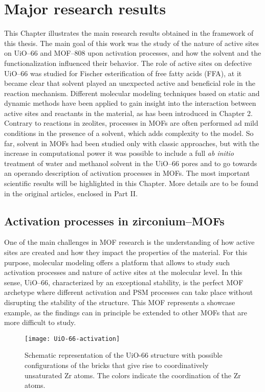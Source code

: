 \graphicspath{{figures/chapter3/}}
\renewcommand\evenpagerightmark{{\scshape\small Major research results}}
\renewcommand\oddpageleftmark{{\scshape\small Chapter 3}}

\hyphenation{}
\chapter[Major research results]%
{Major research results}
\label{ch3}
This Chapter illustrates the main research results obtained in the framework of this thesis. The main goal of this work was the study of the nature of active sites on UiO--66 and MOF--808 upon activation processes, and how the solvent and the functionalization influenced their behavior. The role of active sites on defective UiO--66 was studied for Fischer esterification of free fatty acids (FFA), at it became clear that solvent played an unexpected active and beneficial role in the reaction mechanism. Different molecular modeling techniques based on static and dynamic methods have been applied to gain insight into the interaction between active sites and reactants in the material, as has been introduced in Chapter 2. Contrary to reactions in zeolites, processes in MOFs are often performed ad mild conditions in the presence of a solvent, which adds complexity to the model. So far, solvent in MOFs had been studied only with classic approaches, but with the increase in computational power it was possible to include a full \textit{ab initio} treatment of water and methanol solvent in the UiO--66 pores and to go towards an operando description of activation processes in MOFs. The most important scientific results will be highlighted in this Chapter. More details are to be found in the original articles, enclosed in Part II.

\section{Activation processes in zirconium--MOFs}
One of the main challenges in MOF research is the understanding of how active sites are created and how they impact the properties of the material. For this purpose, molecular modeling offers a platform that allows to study such activation processes and nature of active sites at the molecular level. In this sense, UiO--66, characterized by an exceptional stability, is the perfect MOF archetype where different activation and PSM processes can take place without disrupting the stability of the structure. This MOF represents a showcase example, as the findings can in principle be extended to other MOFs that are more difficult to study.
\begin{figure}[!htbp]
	\centering
	\texttt{[image: UiO-66-activation]}
	\caption{Schematic representation of the UiO-66 structure with possible configurations of the bricks that give rise to coordinatively unsaturated Zr atoms. The colors indicate the coordination of the Zr atoms.}
	\label{fig:UiO-66-activation}
\end{figure}
